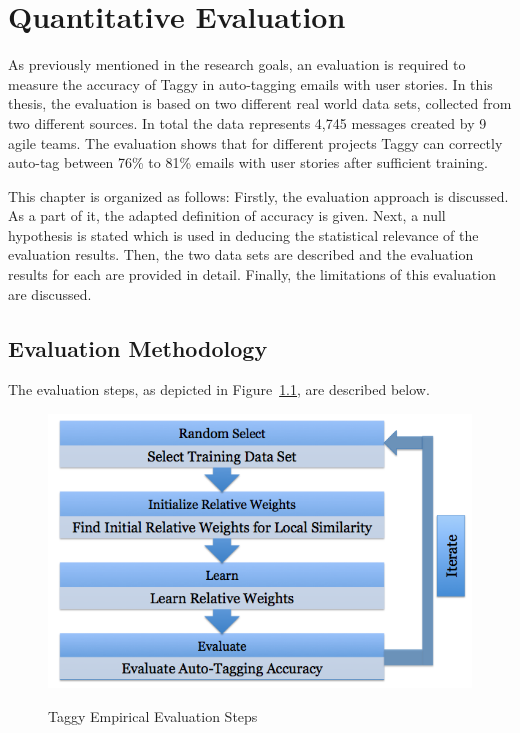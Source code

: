 \fancyhead[RO,LE]{\thepage}
\fancyfoot{} 
\chapter{Quantitative Evaluation}
\label{ch:evaluation}
As previously mentioned in the research goals, an evaluation is required to measure the accuracy of Taggy in auto-tagging emails with user stories. In this thesis, the evaluation is based on two different real world data sets, collected from two different sources. In total the data represents 4,745 messages created by 9 agile teams. The evaluation shows that for different projects Taggy can correctly auto-tag between 76\% to 81\% emails with user stories after sufficient training.

This chapter is organized as follows: Firstly, the evaluation approach is discussed. As a part of it, the adapted definition of accuracy is given. Next, a null hypothesis is stated which is used in deducing the statistical relevance of the evaluation results. Then, the two data sets are described and the evaluation results for each are provided in detail. Finally, the limitations of this evaluation are discussed.

\section{Evaluation Methodology}
The evaluation steps, as depicted in Figure~\ref{fig:evaluation}, are described below.

\begin{figure}[h!]
	\centering
	\includegraphics[width=\textwidth]{Evaluation.png}
	\label{fig:evaluation}
  \caption{Taggy Empirical Evaluation Steps}
\end{figure}


